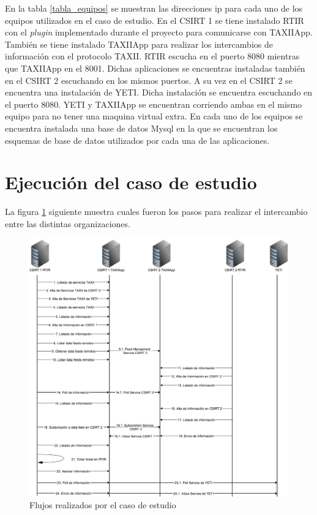 En la tabla \ref{tabla_equipos} se muestran las direcciones ip para cada uno de los equipos utilizados en el caso de estudio. En el CSIRT 1 se tiene instalado RTIR con el \textit{plugin} implementado durante el proyecto para comunicarse con TAXIIApp. También se tiene instalado TAXIIApp para realizar los intercambios de información con el protocolo TAXII. RTIR escucha en el puerto 8080 mientras que TAXIIApp en el 8001.
Dichas aplicaciones se encuentras instaladas también en el CSIRT 2 escuchando en los mismos puertos. A su vez en el CSIRT 2 se encuentra una instalación de YETI. Dicha instalación se encuentra escuchando en el puerto 8080. YETI y TAXIIApp se encuentran corriendo ambas en el mismo equipo para no tener una maquina virtual extra.
En cada uno de los equipos se encuentra instalada una base de datos Mysql en la que se encuentran los esquemas de base de datos utilizados por cada una de las aplicaciones.

\section{Ejecución del caso de estudio}
La figura \ref{fig.flujos} siguiente muestra cuales fueron los pasos para realizar el intercambio entre las distintas organizaciones.

\begin{figure}[h!]
	\centering
	\includegraphics[scale=0.35]{caso-de-estudio/flujos.png}
	\caption{Flujos realizados por el caso de estudio}
	\label{fig.flujos}
\end{figure}

